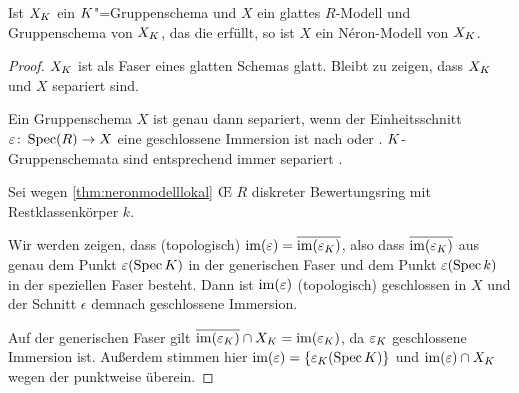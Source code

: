 \documentclass[german, bibliography=totoc]{scrreprt}
\renewcommand*{\optcite}[2][]{}
\begin{document}
\begin{Bemerkung}\label{nerongruppenschemaglatt}
  \optcite[1.2, Remark 7]{neron} 
  Ist $X_{K}$ ein $K$"=Gruppenschema und $X$ ein
  glattes $R$-Modell und Gruppenschema von $X_{K}$, das die
  \NAbbEig erfüllt, so ist $X$ ein Néron-Modell von $X_{K}$.
  \begin{proof}
    $X_{K}$ ist als Faser eines glatten Schemas glatt. Bleibt zu
    zeigen, dass $X_{K}$ und $X$ separiert sind.
    
    Ein Gruppenschema $X$ ist genau dann separiert, wenn der
    Einheitsschnitt $\varepsilon\colon\operatorname{Spec}(R)\to X$ eine geschlossene
    Immersion ist nach
    \cite[Lemma 38.6.1]{stacksproject} oder \cite[7.1, Lemma 2]{neron}.
    $K$-Gruppenschemata sind entsprechend immer separiert
    \cite[Lemma 38.7.3]{stacksproject}. 

    Sei wegen \ref{thm:neronmodelllokal} \OE{} $R$ diskreter
    Bewertungsring mit Restklassenkörper $k$.
    
    Wir werden zeigen, dass (topologisch)
    $\operatorname{im}(\varepsilon)=\overline{\operatorname{im}(\varepsilon_{K})}$,
    also dass $\overline{\operatorname{im}(\varepsilon_{K})}$ aus genau dem Punkt
    $\varepsilon(\operatorname{Spec}K)$ in der generischen Faser und dem Punkt
    $\varepsilon(\operatorname{Spec} k)$ in der speziellen Faser besteht.
    Dann ist $\operatorname{im}(\varepsilon)$ (topologisch) geschlossen in $X$ und der
    Schnitt $\epsilon$ demnach geschlossene Immersion.
    
    Auf der generischen Faser gilt
    $\overline{\operatorname{im}(\varepsilon_{K})}\cap X_{K}=\operatorname{im}(\varepsilon_{K})$,
    da $\varepsilon_{K}$ geschlossene Immersion ist.
    Außerdem stimmen hier $\operatorname{im}(\varepsilon)=\{\varepsilon_{K}(\operatorname{Spec}K)\}$ und
    $\operatorname{im}(\varepsilon)\cap X_{K}$ wegen der \NAbbEig punktweise
    überein.


\end{proof}
\end{Bemerkung}
\end{document}
